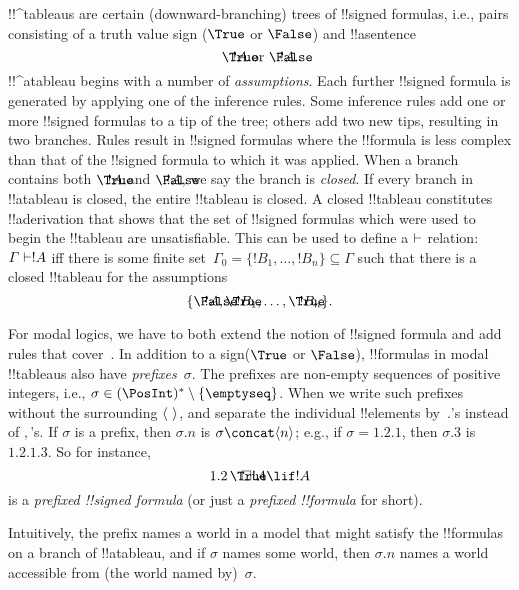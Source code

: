 \documentclass[../../../include/open-logic-section]{subfiles}
\begin{document}


!!^{tableau}s are certain (downward-branching) trees of !!{signed
  formula}s, i.e., pairs consisting of a truth value sign ($\True$ or
$\False$) and !!a{sentence}
\[
\sFmla{\True}{!A} \text{ or } \sFmla{\False}{!A}.
\]
!!^a{tableau} begins with a number of \emph{assumptions}. Each further
!!{signed formula} is generated by applying one of the inference
rules. Some inference rules add one or more !!{signed formula}s to a
tip of the tree; others add two new tips, resulting in two branches.
Rules result in !!{signed formula}s where the !!{formula} is
less complex than that of the !!{signed formula} to which it was
applied. When a branch contains both $\sFmla{\True}{!A}$ and
$\sFmla{\False}{!A}$, we say the branch is \emph{closed}. If every
branch in !!a{tableau} is closed, the entire !!{tableau} is closed. A
closed !!{tableau} constitutes !!a{derivation} that shows that the set
of !!{signed formula}s which were used to begin the !!{tableau} are
unsatisfiable.  This can be used to define a $\Proves$ relation:
$\Gamma \Proves !A$ iff there is some finite set~$\Gamma_0 = \{!B_1,
\dots, !B_n\} \subseteq \Gamma$ such that there is a closed
!!{tableau} for the assumptions
\[
\{\sFmla{\False}{!A}, \sFmla{\True}{!B_1}, \dots, \sFmla{\True}{!B_n}\}.
\]

For modal logics, we have to both extend the notion of !!{signed
formula} and add rules that
cover~. In addition to a sign($\True$ or
$\False$), !!{formula}s in modal !!{tableau}s also have
\emph{prefixes}~$\sigma$. The prefixes are non-empty sequences of
positive integers, i.e., $\sigma \in (\PosInt)^* \setminus
\{\emptyseq\}$. When we write such prefixes without the surrounding
$\langle \  \rangle$, and separate the individual !!{element}s by~$.$'s
instead of $,$'s. If $\sigma$ is a prefix, then $\sigma.n$ is $\sigma
\concat \tuple{n}$; e.g., if $\sigma = 1.2.1$, then $\sigma.3$ is
$1.2.1.3$. So for instance,
\[
\sFmla{\True}{\Box !A \lif !A}[1.2]
\]
is a \emph{prefixed !!{signed formula}} (or just a \emph{prefixed
  !!{formula}} for short).

Intuitively, the prefix names a world in a model that might satisfy
the !!{formula}s on a branch of !!a{tableau}, and if $\sigma$ names
some world, then $\sigma.n$ names a world accessible from (the world
named by)~$\sigma$.
\end{document}

